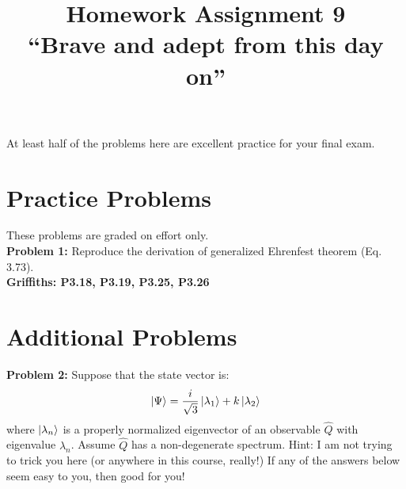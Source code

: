 \documentclass[12pt]{article}
\begin{document}
\newcommand{\ihbar}{\ensuremath{i \hbar}}
\newcommand{\dPsidt}{\ensuremath{ \frac{\partial \Psi}{\partial t} }}
\newcommand{\dPsidx}{\ensuremath{ \frac{\partial \Psi}{\partial x} }}
\newcommand{\ddPsidx}{\ensuremath{ \frac{\partial^2 \Psi}{\partial x^2} }}
\newcommand{\dPssdt}{\ensuremath{ \frac{\partial \Psi^*}{\partial t} }}
\newcommand{\dPssdx}{\ensuremath{ \frac{\partial \Psi^*}{\partial x} }}
\newcommand{\ddPssdx}{\ensuremath{ \frac{\partial^2 \Psi^*}{\partial x^2} }}

\newcommand{\dphidt}{\ensuremath{ \frac{d \phi}{dt} }}
\newcommand{\dpsidx}{\ensuremath{ \frac{d \psi}{dx} }}
\newcommand{\ddpsidx}{\ensuremath{ \frac{d^2 \psi}{dx^2} }}


\date{\vspace{-5ex}}

\title{Homework Assignment 9 \\ ``Brave and adept from this day on''}

\maketitle

\noindent At least half of the problems here are excellent practice for your final exam.

\section*{Practice Problems}

These problems are graded on effort only.\\
\noindent
{\bf Problem 1:} Reproduce the derivation of generalized Ehrenfest theorem (Eq. 3.73).\\
\noindent
{\bf Griffiths: P3.18, P3.19, P3.25, P3.26} \\
  
\section*{Additional Problems}

\noindent
{\bf Problem 2:} Suppose that the state vector is:
$$\ket{\Psi} = \frac{i}{\sqrt{3}} \ket{\lambda_1} + k \ket{\lambda_2}$$
where $\ket{\lambda_n}$ is a properly normalized eigenvector of an observable $\hat{Q}$ with eigenvalue $\lambda_n$.  Assume $\hat{Q}$ has a non-degenerate spectrum.  Hint:  I am not trying to trick you here (or anywhere in this course, really!)  If any of the answers below seem easy to you, then good for you!\\[5pt]
\end{document}
